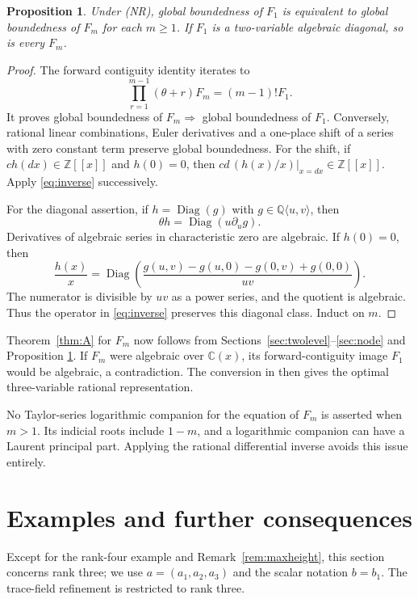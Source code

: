 \documentclass[11pt]{amsart}
\newtheorem{proposition}[theorem]{Proposition}
\theoremstyle{definition}
\theoremstyle{remark}
\numberwithin{equation}{section}
\newcommand{\Q}{\mathbb{Q}}
\newcommand{\Z}{\mathbb{Z}}
\newcommand{\C}{\mathbb{C}}
\newcommand{\alg}[2]{#1\langle #2\rangle}
\DeclareMathOperator{\Diag}{Diag}
\begin{document}
\begin{proposition}\label{prop:integral}
Under (NR), global boundedness of \(F_1\) is equivalent to global
boundedness of \(F_m\) for each \(m\ge1\). If \(F_1\) is a two-variable
algebraic diagonal, so is every \(F_m\).

\end{proposition}\begin{proof} The forward contiguity identity iterates to
\[\prod_{r=1}^{m-1}(\theta+r)F_m=(m-1)!F_1.\] It proves global
boundedness of \(F_m\Rightarrow\) global boundedness of \(F_1\).
Conversely, rational linear combinations, Euler derivatives and a
one-place shift of a series with zero constant term preserve global
boundedness. For the shift, if \(c h(dx)\in\Z[[x]]\) and \(h(0)=0\),
then \(cd\,(h(x)/x)|_{x=dx}\in\Z[[x]]\). Apply \eqref{eq:inverse} successively.

For the diagonal assertion, if \(h=\Diag(g)\) with
\(g\in\alg{\Q}{u,v}\), then \[\theta h=\Diag(u\partial_u g).\]
Derivatives of algebraic series in characteristic zero are algebraic. If
\(h(0)=0\), then
\[\frac{h(x)}x=\Diag\left(\frac{g(u,v)-g(u,0)-g(0,v)+g(0,0)}{uv}\right).\]
The numerator is divisible by \(uv\) as a power series, and the quotient
is algebraic. Thus the operator in \eqref{eq:inverse} preserves this diagonal class.
Induct on \(m\). \end{proof}

Theorem~\ref{thm:A} for \(F_m\) now follows from Sections~\ref{sec:twolevel}--\ref{sec:node} and Proposition
\ref{prop:integral}. If \(F_m\) were algebraic over \(\C(x)\), its forward-contiguity
image \(F_1\) would be algebraic, a contradiction. The conversion in
\citep[Lemma~3.2]{HarderKramerMiller2025} then gives the optimal three-variable rational
representation.

No Taylor-series logarithmic companion for the equation of $F_m$ is asserted when $m>1$. Its indicial roots include $1-m$, and a logarithmic companion can have a Laurent principal part. Applying the rational differential inverse avoids this issue entirely.

\section{Examples and further consequences}\label{sec:examples}

Except for the rank-four example and Remark~\ref{rem:maxheight}, this section concerns rank three; we use $a=(a_1,a_2,a_3)$ and the scalar notation $b=b_1$. The trace-field refinement is restricted to rank three.
\end{document}
